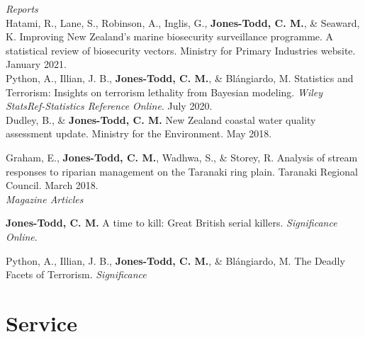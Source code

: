 \documentclass[10pt,a4paper]{moderncv}
\begin{document}
\textit{\small{Reports}}\\

Hatami, R., Lane, S., Robinson, A.,  Inglis, G.,  \textbf{Jones-Todd, C. M.}, \& Seaward, K. Improving New Zealand’s marine biosecurity surveillance programme. A statistical review of biosecurity vectors.  Ministry for Primary Industries website. January 2021.\\

Python, A.,  Illian, J. B., \textbf{Jones-Todd, C. M.}, \& Bl\'{a}ngiardo, M. Statistics and Terrorism: Insights on terrorism lethality from Bayesian modeling. \textit{Wiley StatsRef-Statistics Reference Online}. July 2020.\\

Dudley, B., \& \textbf{Jones-Todd, C. M.} New Zealand coastal water quality assessment update. Ministry for the Environment. May 2018.

\vspace{5pt}

Graham, E., \textbf{Jones-Todd, C. M.}, Wadhwa, S., \& Storey, R. Analysis of stream responses to riparian management on the Taranaki ring plain. Taranaki Regional Council. March 2018.\\

\newpage
\textit{\small{Magazine Articles}}\\

\vspace{-3pt}

\textbf{Jones-Todd, C. M.} A time to kill: Great British serial killers. \textit{Significance Online}. \\

\vspace{-3pt}

Python, A.,  Illian, J. B., \textbf{Jones-Todd, C. M.}, \& Bl\'{a}ngiardo, M. The Deadly Facets of Terrorism. \textit{Significance}\\

\vspace{5pt}


\section{Service}
\vspace{6pt}
\end{document}
